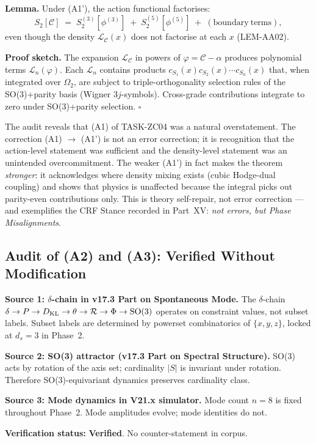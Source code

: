\documentclass[12pt, a4paper]{article}
\begin{document}
\begin{formalbox}[title={LEM-AA03: Integral Orthogonality Recovers
  Action Factorisation}]
\textbf{Lemma.} Under (A1'), the action functional factorises:
\begin{equation}
  S_2[\mathcal{C}]
  \;=\;
  S_2^{(3)}[\phi^{(3)}] \;+\; S_2^{(5)}[\phi^{(5)}]
  \;+\;
  \mathrm{(boundary\ terms)},
\end{equation}
even though the density $\mathcal{L}_\mathcal{C}(x)$ does not
factorise at each $x$ (LEM-AA02).

\textbf{Proof sketch.} The expansion $\mathcal{L}_\mathcal{C}$ in
powers of $\varphi = \mathcal{C} - \alpha$ produces polynomial
terms $\mathcal{L}_n(\varphi)$. Each $\mathcal{L}_n$ contains
products $c_{S_1}(x) c_{S_2}(x) \cdots c_{S_n}(x)$ that, when
integrated over $\Omega_2$, are subject to triple-orthogonality
selection rules of the SO(3)+parity basis (Wigner 3$j$-symbols).
Cross-grade contributions integrate to zero under SO(3)+parity
selection. \hfill$\square$
\end{formalbox}

\begin{keybox}[title={The Phase Misalignment, Repaired Upward}]
The audit reveals that (A1) of TASK-ZC04 was a natural overstatement.
The correction (A1) $\to$ (A1') is not an error correction; it is
recognition that the action-level statement was sufficient and the
density-level statement was an unintended overcommitment. The
weaker (A1') in fact makes the theorem \emph{stronger}: it
acknowledges where density mixing exists (cubic Hodge-dual coupling)
and shows that physics is unaffected because the integral picks out
parity-even contributions only. This is theory self-repair, not
error correction --- and exemplifies the CRF Stance recorded in
Part~XV: \emph{not errors, but Phase Misalignments}.
\end{keybox}

\subsection{Audit of (A2) and (A3): Verified Without Modification}

\begin{formalbox}[title={(A2) Verification --- Sources}]
\textbf{Source 1: $\delta$-chain in v17.3 Part on Spontaneous Mode.}
The $\delta$-chain
$\delta \to P \to D_{\rm KL} \to \theta \to \mathcal{R} \to \Phi
\to \mathrm{SO(3)}$
operates on constraint values, not subset labels. Subset labels are
determined by powerset combinatorics of $\{x,y,z\}$, locked at
$d_s = 3$ in Phase~2.

\textbf{Source 2: SO(3) attractor (v17.3 Part on Spectral Structure).}
SO(3) acts by rotation of the axis set; cardinality $|S|$ is
invariant under rotation. Therefore SO(3)-equivariant dynamics
preserves cardinality class.

\textbf{Source 3: Mode dynamics in V21.x simulator.} Mode count
$n = 8$ is fixed throughout Phase~2. Mode amplitudes evolve;
mode identities do not.

\textbf{Verification status:} \textbf{Verified}. No counter-statement
in corpus.
\end{formalbox}
\end{document}
